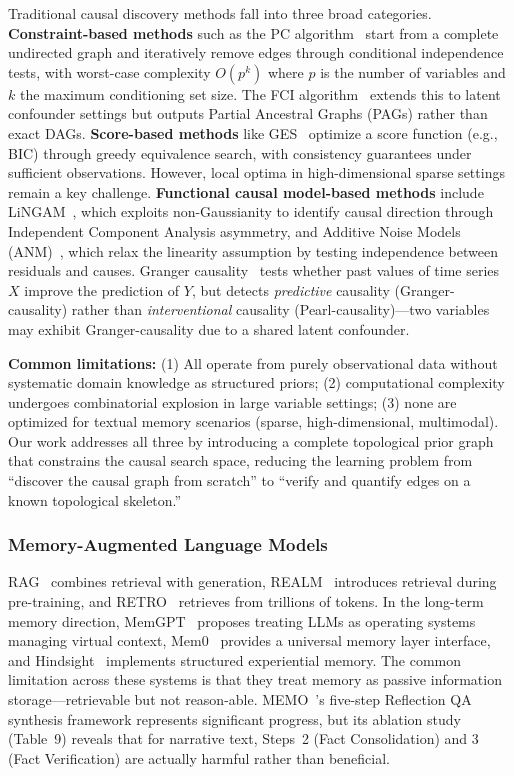 \documentclass[11pt,a4paper]{article}
\begin{document}
Traditional causal discovery methods fall into three broad categories. \textbf{Constraint-based methods} such as the PC algorithm~\cite{spirtes2000} start from a complete undirected graph and iteratively remove edges through conditional independence tests, with worst-case complexity \(O(p^k)\) where \(p\) is the number of variables and \(k\) the maximum conditioning set size. The FCI algorithm~\cite{colombo2012} extends this to latent confounder settings but outputs Partial Ancestral Graphs (PAGs) rather than exact DAGs. \textbf{Score-based methods} like GES~\cite{chickering2002} optimize a score function (e.g., BIC) through greedy equivalence search, with consistency guarantees under sufficient observations. However, local optima in high-dimensional sparse settings remain a key challenge. \textbf{Functional causal model-based methods} include LiNGAM~\cite{shimizu2006}, which exploits non-Gaussianity to identify causal direction through Independent Component Analysis asymmetry, and Additive Noise Models (ANM)~\cite{hoyer2009}, which relax the linearity assumption by testing independence between residuals and causes. Granger causality~\cite{granger1969} tests whether past values of time series \(X\) improve the prediction of \(Y\), but detects \textit{predictive} causality (Granger-causality) rather than \textit{interventional} causality (Pearl-causality)---two variables may exhibit Granger-causality due to a shared latent confounder.

\textbf{Common limitations:} (1) All operate from purely observational data without systematic domain knowledge as structured priors; (2) computational complexity undergoes combinatorial explosion in large variable settings; (3) none are optimized for textual memory scenarios (sparse, high-dimensional, multimodal). Our work addresses all three by introducing a complete topological prior graph that constrains the causal search space, reducing the learning problem from ``discover the causal graph from scratch'' to ``verify and quantify edges on a known topological skeleton.''

\subsubsection{Memory-Augmented Language Models}

RAG~\cite{lewis2020} combines retrieval with generation, REALM~\cite{guu2020} introduces retrieval during pre-training, and RETRO~\cite{borgeaud2022} retrieves from trillions of tokens. In the long-term memory direction, MemGPT~\cite{packer2023} proposes treating LLMs as operating systems managing virtual context, Mem0~\cite{mem0} provides a universal memory layer interface, and Hindsight~\cite{hindsight} implements structured experiential memory. The common limitation across these systems is that they treat memory as passive information storage---retrievable but not reason-able. MEMO~\cite{memo2025}'s five-step Reflection QA synthesis framework represents significant progress, but its ablation study (Table~9) reveals that for narrative text, Steps~2 (Fact Consolidation) and 3 (Fact Verification) are actually harmful rather than beneficial.
\end{document}
